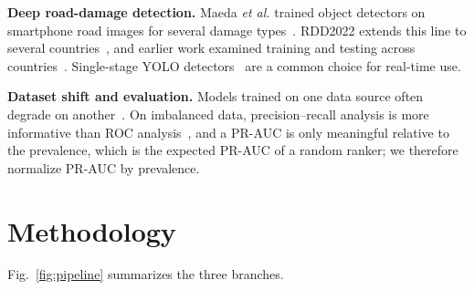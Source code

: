 \documentclass[conference]{IEEEtran}
\begin{document}
\textbf{Deep road-damage detection.} Maeda \textit{et al.} trained object detectors on smartphone road images for several damage types~\cite{maeda2018road}. RDD2022 extends this line to several countries~\cite{arya2022rdd2022}, and earlier work examined training and testing across countries~\cite{arya2021deep}. Single-stage YOLO detectors~\cite{redmon2016yolo,jocher2023yolo} are a common choice for real-time use.

\textbf{Dataset shift and evaluation.} Models trained on one data source often degrade on another~\cite{torralba2011bias,bendavid2010domain}. On imbalanced data, precision--recall analysis is more informative than ROC analysis~\cite{saito2015precision}, and a PR-AUC is only meaningful relative to the prevalence, which is the expected PR-AUC of a random ranker; we therefore normalize PR-AUC by prevalence.

\section{Methodology}
Fig.~\ref{fig:pipeline} summarizes the three branches.
\end{document}
